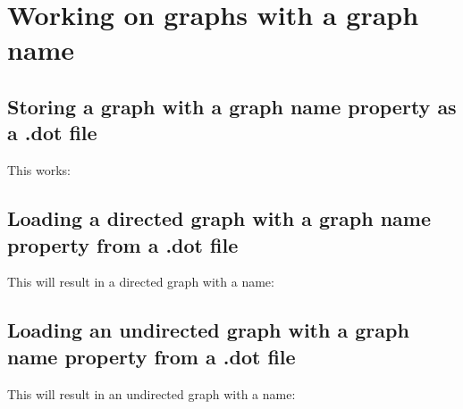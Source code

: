 \chapter{Working on graphs with a graph name}

\section{Storing a graph with a graph name property as a .dot file}
\label{subsec:save_graph_with_graph_name_to_dot}

This works:



\section{Loading a directed graph with a graph name property from a .dot file}
\label{subsec:load_directed_graph_with_graph_name_from_dot}

This will result in a directed graph with a name:



\section{Loading an undirected graph with a graph name property from a .dot file}
\label{subsec:load_undirected_graph_with_graph_name_from_dot}

This will result in an undirected graph with a name:



